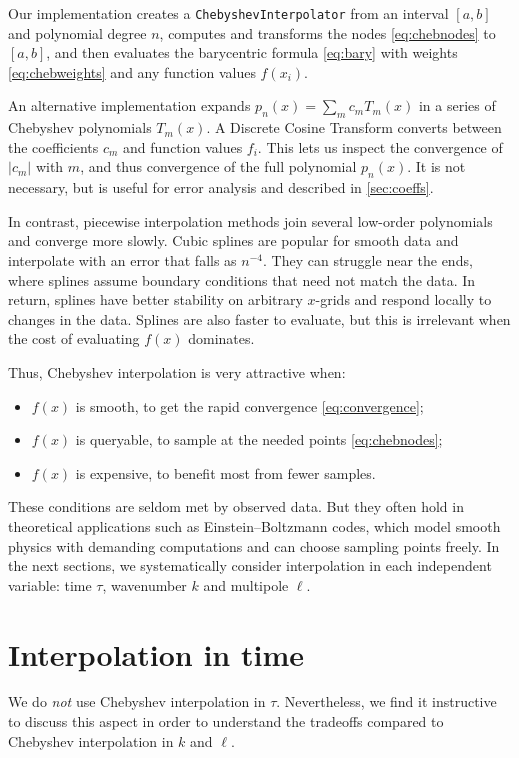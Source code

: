 \documentclass{aa}
\newcommand\EB{Einstein–Boltzmann}
\begin{document}
Our implementation creates a \texttt{ChebyshevInterpolator} from an interval $[a, b]$ and polynomial degree $n$,
computes and transforms the nodes \eqref{eq:chebnodes} to $[a, b]$,
and then evaluates the barycentric formula \eqref{eq:bary} with weights \eqref{eq:chebweights} and any function values $f(x_i)$.

An alternative implementation expands $p_n(x) = \sum_m c_m T_m(x)$ in a series of Chebyshev polynomials $T_m(x)$.
A Discrete Cosine Transform converts between the coefficients $c_m$ and function values $f_i$.
This lets us inspect the convergence of $\lvert c_m \rvert$ with $m$,
and thus convergence of the full polynomial $p_n(x)$.
It is not necessary, but is useful for error analysis and described in \cref{sec:coeffs}.

In contrast, piecewise interpolation methods join several low-order polynomials and converge more slowly.
Cubic splines are popular for smooth data and interpolate with an error that falls as $n^{-4}$.
They can struggle near the ends, where splines assume boundary conditions that need not match the data.
In return, splines have better stability on arbitrary $x$-grids and respond locally to changes in the data.
Splines are also faster to evaluate,
but this is irrelevant when the cost of evaluating $f(x)$ dominates.

Thus, Chebyshev interpolation is very attractive when:%
\begin{itemize}
\item $f(x)$ is smooth, to get the rapid convergence \eqref{eq:convergence};
\item $f(x)$ is queryable, to sample at the needed points \eqref{eq:chebnodes};
\item $f(x)$ is expensive, to benefit most from fewer samples.
\end{itemize}
These conditions are seldom met by observed data.
But they often hold in theoretical applications such as \EB{} codes,
which model smooth physics with demanding computations and can choose sampling points freely.
In the next sections, we systematically consider interpolation in each independent variable:
time $\tau$, wavenumber $k$ and multipole $\ell$.

\section{Interpolation in time}
\label{sec:time}

We do \emph{not} use Chebyshev interpolation in $\tau$.
Nevertheless, we find it instructive to discuss this aspect in order to understand the tradeoffs compared to Chebyshev interpolation in $k$ and $\ell$.
\end{document}
